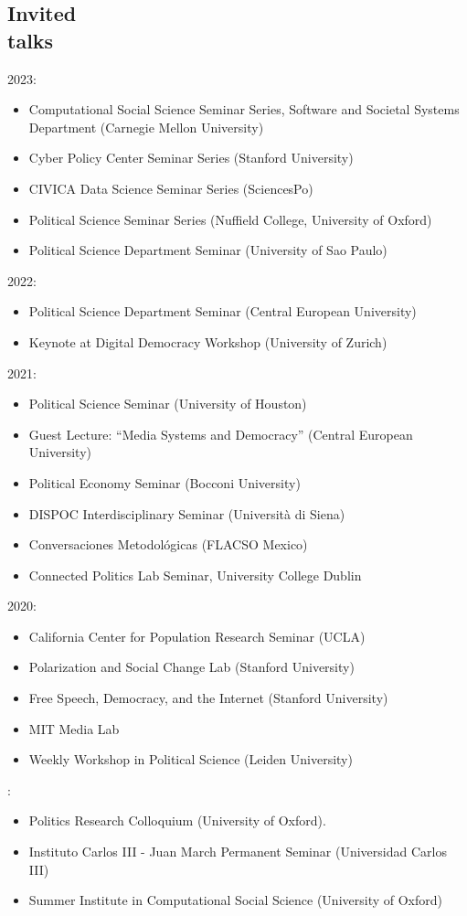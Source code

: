 \documentclass[margin,line,11pt]{resume}
\begin{document}
\begin{resume}
        \section{\mysidestyle Invited\\talks}
2023:
\begin{itemize}
\item Computational Social Science Seminar Series, Software and Societal Systems Department (Carnegie Mellon University)
\item Cyber Policy Center Seminar Series (Stanford University)
\item CIVICA Data Science Seminar Series (SciencesPo)
\item Political Science Seminar Series (Nuffield College, University of Oxford)
\item Political Science Department Seminar (University of Sao Paulo)
\end{itemize}

2022:
\begin{itemize}
\item Political Science Department Seminar (Central European University)
\item Keynote at Digital Democracy Workshop (University of Zurich)
\end{itemize}

2021:
\begin{itemize}
\item Political Science Seminar (University of Houston)
\item Guest Lecture: ``Media Systems and Democracy'' (Central European University)
\item Political Economy Seminar (Bocconi University)
\item DISPOC Interdisciplinary Seminar (Universit\`{a} di Siena)
\item Conversaciones Metodol\'{o}gicas (FLACSO Mexico)
\item Connected Politics Lab Seminar, University College Dublin
\end{itemize}

2020:
\begin{itemize}
\item California Center for Population Research Seminar (UCLA)
\item Polarization and Social Change Lab (Stanford University)
\item Free Speech, Democracy, and the Internet (Stanford University)
\item MIT Media Lab
\item Weekly Workshop in Political Science (Leiden University)
\end{itemize}    
: 
\begin{itemize} 
\item Politics Research Colloquium (University of Oxford).
\item Instituto Carlos III - Juan March Permanent Seminar (Universidad Carlos III)
\item Summer Institute in Computational Social Science (University of Oxford)
\end{itemize}



\end{resume}
\end{document}
